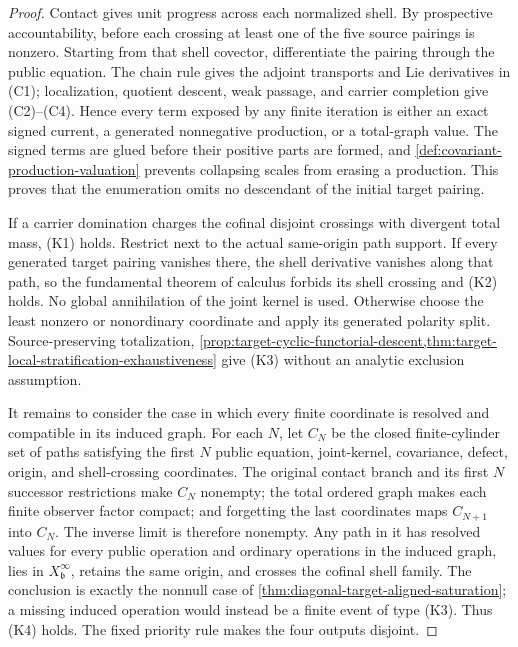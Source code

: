 \documentclass[11pt]{article}
\numberwithin{section}{part}
\theoremstyle{plain}
\theoremstyle{definition}
\theoremstyle{remark}
\begin{document}
\begin{proof}
Contact gives unit progress across each normalized shell.  By prospective
accountability, before each crossing at least one of the five source pairings
is nonzero.  Starting from that shell covector, differentiate the pairing
through the public equation.  The chain rule gives the adjoint transports and
Lie derivatives in \textup{(C1)}; localization, quotient descent, weak
passage, and carrier completion give \textup{(C2)}--\textup{(C4)}.  Hence
every term exposed by any finite iteration is either an exact signed current,
a generated nonnegative production, or a total-graph value.  The signed
terms are glued before their positive parts are formed, and
\cref{def:covariant-production-valuation} prevents collapsing scales from
erasing a production.  This proves that the enumeration omits no descendant
of the initial target pairing.

If a carrier domination charges the cofinal disjoint crossings with divergent
total mass, \textup{(K1)} holds.  Restrict next to the actual same-origin path
support.  If every generated target pairing vanishes there, the shell
derivative vanishes along that path, so the fundamental theorem of calculus
forbids its shell crossing and \textup{(K2)} holds.  No global annihilation
of the joint kernel is used.  Otherwise choose the least nonzero or
nonordinary coordinate and apply its generated polarity split.
Source-preserving totalization,
\cref{prop:target-cyclic-functorial-descent,thm:target-local-stratification-exhaustiveness}
give \textup{(K3)} without an analytic exclusion assumption.

It remains to consider the case in which every finite coordinate is resolved
and compatible in its induced graph.  For each \(N\), let \(C_N\) be the closed finite-cylinder
set of paths satisfying the first \(N\) public equation, joint-kernel,
covariance, defect, origin, and shell-crossing coordinates.  The original
contact branch and its first \(N\) successor restrictions make \(C_N\)
nonempty; the total ordered graph makes each finite observer factor compact;
and forgetting the last coordinates maps \(C_{N+1}\) into \(C_N\).
The inverse limit is therefore nonempty.  Any path in it has resolved values
for every public operation and ordinary operations in the induced graph,
lies in \(X^\infty_{\mathfrak b}\), retains the
same origin, and crosses the cofinal shell family.  The conclusion is exactly
the nonnull case of
\cref{thm:diagonal-target-aligned-saturation}; a missing induced operation
would instead be a finite event of type \textup{(K3)}.  Thus
\textup{(K4)} holds.  The fixed priority rule makes the four outputs
disjoint.
\end{proof}
\end{document}
